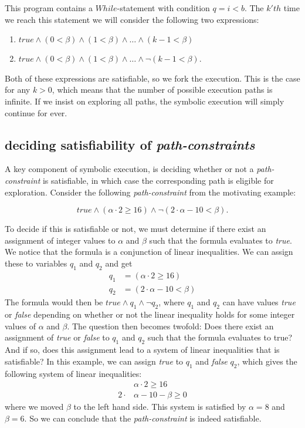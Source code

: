	This program contains a $While$-statement with condition $q = i < b$. The $k'th$ time we reach this statement we will consider the following two expressions:
	\begin{enumerate}
		\item $true \land (0 < \beta) \land (1 < \beta) \land \ldots \land (k-1 < \beta) $
		\item $true \land (0 < \beta) \land (1 < \beta) \land \ldots \land \neg (k-1 < \beta) $.
	\end{enumerate}
	Both of these expressions are satisfiable, so we fork the execution. This is the case for any $k > 0$, which means that the number of possible execution paths is infinite. If we insist on exploring all paths, the symbolic execution will simply continue for ever. 
	
	\subsection{deciding satisfiability of \emph{path-constraints}}
	A key component of symbolic execution, is deciding whether or not a \emph{path-constraint} is satisfiable, in which case the corresponding path is eligible for exploration. Consider the following \emph{path-constraint} from the motivating example:
	
	\begin{equation}	
		true \land (\alpha \cdot 2 \geq 16) \land \neg (2\cdot \alpha - 10 < \beta).
	\end{equation}
	
	To decide if this is satisfiable or not, we must determine if there exist an assignment of integer values to $\alpha$ and $\beta$ such that the formula evaluates to \emph{true}. We notice that the formula is a conjunction of linear inequalities. We can assign these to variables $q_1$ and $q_2$ and get
	\begin{align}
		q_1 & = (\alpha \cdot 2 \geq 16) \\
		q_2 & = (2\cdot \alpha - 10 < \beta)
	\end{align}
	The formula would then be $true\land q_1 \land \neg q_2$,
	where $q_1$ and $q_2$ can have values \emph{true} or \emph{false} depending on whether or not the linear inequality holds for some integer values of $\alpha$ and $\beta$. The question then becomes twofold: Does there exist an assignment of \emph{true} or \emph{false} to $q_1$ and $q_2$ such that the formula evaluates to true? And if so, does this assignment lead to a system of linear inequalities that is satisfiable?
	In this example, we can assign \emph{true} to $q_1$ and \emph{false} $q_2$, which gives the following system of linear inequalities:
	\begin{align}
		& \alpha \cdot 2 \geq 16 \\
		2  \cdot & \alpha - 10 - \beta \geq 0 
	\end{align}
	where we moved $\beta$ to the left hand side. This system is satisfied by $\alpha = 8$ and $\beta = 6$. So we can conclude that the \emph{path-constraint} is indeed satisfiable.
	
